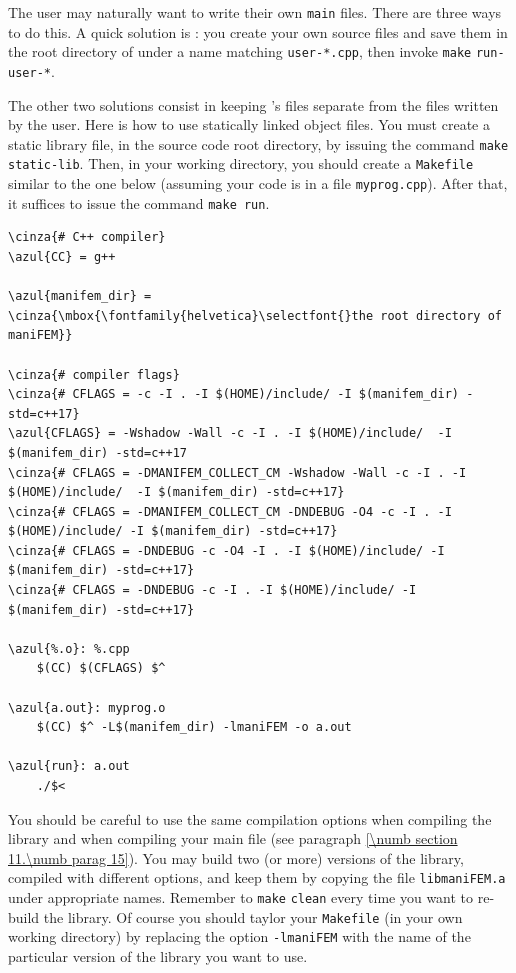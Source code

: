 The user may naturally want to write their own {\small\tt main} files.
There are three ways to do this.
A quick solution is : you create your own source files and save them in the root directory
of {\maniFEM} under a name matching {\small\tt user-*.cpp},
then invoke {\small\tt make} {\small\tt run-user-*}.

The other two solutions consist in keeping \maniFEM's files separate from the files written
by the user.
Here is how to use statically linked object files.
You must create a static library file, in the {\maniFEM} source code root directory,
by issuing the command {\small\tt make static-lib}.
Then, in your working directory, you should create a {\small\tt Makefile} similar to
the one below (assuming your code is in a file {\small\tt myprog.cpp}).
After that, it suffices to issue the command {\small\tt make run}.

\begin{Verbatim}[commandchars=\\\{\},formatcom=\small\tt,frame=single,
   label=Makefile,rulecolor=\color{coment},
   baselinestretch=0.94,framesep=2mm                                            ]
\cinza{# C++ compiler}
\azul{CC} = g++

\azul{manifem_dir} = \cinza{\mbox{\fontfamily{helvetica}\selectfont{}the root directory of maniFEM}}

\cinza{# compiler flags}
\cinza{# CFLAGS = -c -I . -I $(HOME)/include/ -I $(manifem_dir) -std=c++17}
\azul{CFLAGS} = -Wshadow -Wall -c -I . -I $(HOME)/include/  -I $(manifem_dir) -std=c++17
\cinza{# CFLAGS = -DMANIFEM_COLLECT_CM -Wshadow -Wall -c -I . -I $(HOME)/include/  -I $(manifem_dir) -std=c++17}
\cinza{# CFLAGS = -DMANIFEM_COLLECT_CM -DNDEBUG -O4 -c -I . -I $(HOME)/include/ -I $(manifem_dir) -std=c++17}
\cinza{# CFLAGS = -DNDEBUG -c -O4 -I . -I $(HOME)/include/ -I $(manifem_dir) -std=c++17}
\cinza{# CFLAGS = -DNDEBUG -c -I . -I $(HOME)/include/ -I $(manifem_dir) -std=c++17}

\azul{%.o}: %.cpp
	$(CC) $(CFLAGS) $^

\azul{a.out}: myprog.o
	$(CC) $^ -L$(manifem_dir) -lmaniFEM -o a.out

\azul{run}: a.out
	./$<
\end{Verbatim}

You should be careful to use the same compilation options when compiling the library and
when compiling your main file (see paragraph \ref{\numb section 11.\numb parag 15}).
You may build two (or more) versions of the library, compiled with different options,
and keep them by copying the file {\small\tt libmaniFEM.a} under appropriate names.
Remember to {\small\tt make} {\small\tt clean} every time you want to re-build the library.
Of course you should taylor your {\small\tt Makefile} (in your own working directory)
by replacing the option {\small\tt -lmaniFEM} with the name of the particular version
of the library you want to use.

